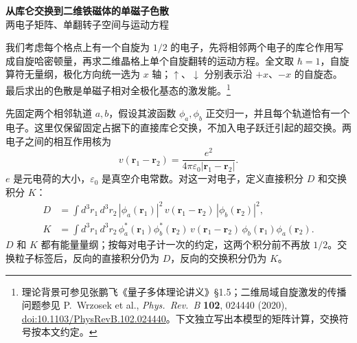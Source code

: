\documentclass[UTF8,11pt,a4paper,fontset=fandol]{ctexart}
\begin{document}
\begin{center}
{\LARGE\bfseries\color{ink}从库仑交换到二维铁磁体的单磁子色散}\\[0.65em]
{\small 两电子矩阵、单翻转子空间与运动方程}
\end{center}
\vspace{0.3em}

我们考虑每个格点上有一个自旋为 $1/2$ 的电子，先将相邻两个电子的库仑作用写成自旋哈密顿量，再求二维晶格上单个自旋翻转的运动方程。全文取 $\hbar=1$，自旋算符无量纲，极化方向统一选为 $x$ 轴；$\uparrow$、$\downarrow$ 分别表示沿 $+x$、$-x$ 的自旋态。最后求出的色散是单磁子相对全极化基态的激发能。\footnote{理论背景可参见张鹏飞《量子多体理论讲义》§1.5；二维局域自旋激发的传播问题参见 P.~Wrzosek et al., \textit{Phys.\ Rev.\ B} \textbf{102}, 024440 (2020), \href{https://doi.org/10.1103/PhysRevB.102.024440}{doi:10.1103/PhysRevB.102.024440}。下文独立写出本模型的矩阵计算，交换符号按本文约定。}

先固定两个相邻轨道 $a,b$，假设其波函数 $\phi_a,\phi_b$ 正交归一，并且每个轨道恰有一个电子。这里仅保留固定占据下的直接库仑交换，不加入电子跃迁引起的超交换。两电子之间的相互作用核为
\begin{equation}
v(\mathbf r_1-\mathbf r_2)=
\frac{e^2}{4\pi\varepsilon_0|\mathbf r_1-\mathbf r_2|}.
\end{equation}
$e$ 是元电荷的大小，$\varepsilon_0$ 是真空介电常数。对这一对电子，定义直接积分 $D$ 和交换积分 $K$：
\begin{align}
D&=\int d^3r_1\,d^3r_2\,
|\phi_a(\mathbf r_1)|^2\,v(\mathbf r_1-\mathbf r_2)\,
|\phi_b(\mathbf r_2)|^2, \label{eq:direct}\\
K&=\int d^3r_1\,d^3r_2\,
\phi_a^*(\mathbf r_1)\phi_b^*(\mathbf r_2)\,
v(\mathbf r_1-\mathbf r_2)\,
\phi_b(\mathbf r_1)\phi_a(\mathbf r_2). \label{eq:exchange}
\end{align}
$D$ 和 $K$ 都有能量量纲；按每对电子计一次的约定，这两个积分前不再放 $1/2$。交换粒子标签后，反向的直接积分仍为 $D$，反向的交换积分仍为 $K$。
\end{document}
